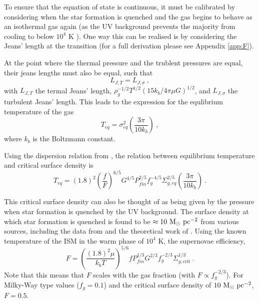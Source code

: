     To ensure that the equation of state is continuous, it must be calibrated by considering when the star formation is quenched and the gas begins to behave as an isothermal gas again (as the UV background prevents the majority from cooling to below $10^4$ K \citep{gnat_time-dependent_2007}).
One way this can be realised is by considering the Jeans' length at the transition (for a full derivation please see Appendix \ref{app:F}).

At the point where the thermal pressure and the trublent pressures are equal, their jeans lengths must also be equal, such that
$$
     L_{J, T} = L_{J, \sigma}~,
$$
with $L_{J, T}$ the termal Jeans' length, $ \rho_g^{-1/2} T^{1/2} \left({15k_b}/{4\pi \mu G}\right)^{1/2} $, and $L_{J, \sigma}$ the turbulent Jeans' length.
This leads to the expression for the equlibrium temperature of the gas
\begin{equation}
    T_{eq} = \sigma^2_{eq} \left(\frac{3 \pi}{10 k_b}\right)~,
    \label{eqn:teq}
\end{equation}
where $k_b$ is the Boltzmann constant.

Using the dispersion relation from \citet{martizzi_supernova_2015}, the relation between equilibrium temperature and critical surface density is
$$
T_{eq} = (1.8)^2 \left(\frac{f}{F}\right)^{6/5} G^{4/5} P_{fin}^{2/5} f_g^{-4/5} \Sigma_{g, eq}^{2/5} \left(\frac{3\pi}{10k_b}\right)~.
$$

This critical surface density can also be thought of as being given by the pressure when star formation is quenched by the UV background.
The surface density at which star formation is quenched is found to be $\approx 10 ~\mathrm{M}_{\odot} ~\mathrm{pc}^{-2}$ from various sources, including the data from \citet{bigiel_star_2008} and the theoretical work of \citet{schaye_star_2004}.
Using the known temperature of the ISM in the warm phase of $10^{4}$ K, the supernovae efficiency,
\begin{equation}
    F = \left(\frac{(1.8)^2 \mu}{k_b T}\right)^{5/6} f P_{fin}^{1/3} G^{2/3} f_g^{-2/3} \Sigma_{g, \mathrm{crit}}^{1/3}~.
    \label{eqn:Fcalib}
\end{equation}
Note that this means that $F$ scales with the gas fraction (with $F \propto f_g^{-2/3}$).
For Milky-Way type values ($f_g = 0.1$) and the critical surface density of $10 ~\mathrm{M}_{\odot} ~\mathrm{pc}^{-2}$, $F=0.5$.
